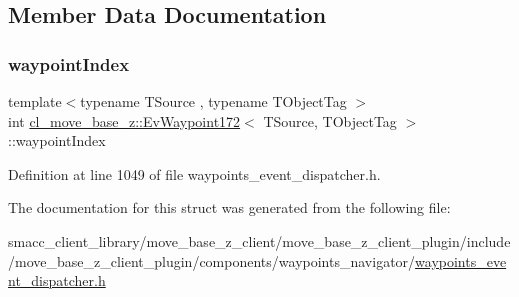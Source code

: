 \subsection{Member Data Documentation}
\mbox{\label{structcl__move__base__z_1_1EvWaypoint172_a4c4c168e2036935ea118a100f2df71e3}} 
\subsubsection{\texorpdfstring{waypoint\+Index}{waypointIndex}}
{\footnotesize\ttfamily template$<$typename T\+Source , typename T\+Object\+Tag $>$ \\
int \hyperlink{structcl__move__base__z_1_1EvWaypoint172}{cl\+\_\+move\+\_\+base\+\_\+z\+::\+Ev\+Waypoint172}$<$ T\+Source, T\+Object\+Tag $>$\+::waypoint\+Index}



Definition at line 1049 of file waypoints\+\_\+event\+\_\+dispatcher.\+h.



The documentation for this struct was generated from the following file\+:\begin{DoxyCompactItemize}
\item 
smacc\+\_\+client\+\_\+library/move\+\_\+base\+\_\+z\+\_\+client/move\+\_\+base\+\_\+z\+\_\+client\+\_\+plugin/include/move\+\_\+base\+\_\+z\+\_\+client\+\_\+plugin/components/waypoints\+\_\+navigator/\hyperlink{waypoints__event__dispatcher_8h}{waypoints\+\_\+event\+\_\+dispatcher.\+h}\end{DoxyCompactItemize}

